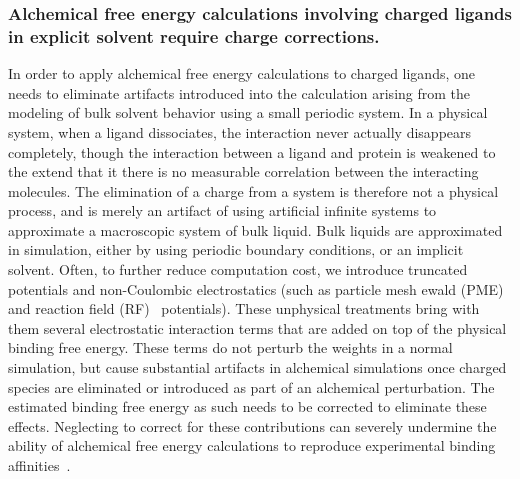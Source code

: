 \documentclass[10pt,final]{article}
\begin{document}
\subsubsection*{Alchemical free energy calculations involving charged ligands in explicit solvent require charge corrections.}
In order to apply alchemical free energy calculations to charged ligands, one needs to eliminate artifacts introduced into the calculation arising from the modeling of bulk solvent behavior using a small periodic system.
%
In a physical system, when a ligand dissociates, the interaction never actually disappears completely, though the interaction between a ligand and protein is weakened to the extend that it there is no measurable correlation between the interacting molecules.
%
The elimination of a charge from a system is therefore not a physical process, and is merely an artifact of using artificial infinite systems to approximate a macroscopic system of bulk liquid.
%
Bulk liquids are approximated in simulation, either by using periodic boundary conditions, or an implicit solvent.
%
Often, to further reduce computation cost, we introduce truncated potentials and non-Coulombic electrostatics (such as particle mesh ewald (PME)~\autocite{Essmann1995a} and reaction field (RF)~\autocite{Tironi1995a} potentials). 
%
These unphysical treatments bring with them several electrostatic interaction terms that are added on top of the physical binding free energy.
%
These terms do not perturb the weights in a normal simulation, but cause substantial artifacts in alchemical simulations once charged species are eliminated or introduced as part of an alchemical perturbation.
%
The estimated binding free energy as such needs to be corrected to eliminate these effects.
%
Neglecting to correct for these contributions can severely undermine the ability of alchemical free energy calculations to reproduce experimental binding affinities~\autocite{Rocklin2013b,Muddana2014a}.
\end{document}
